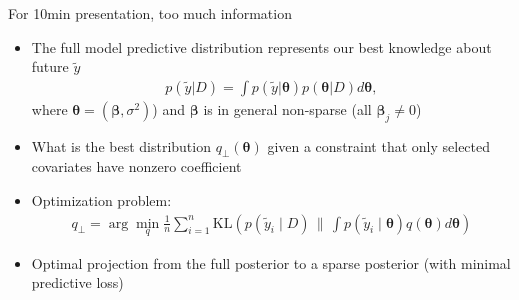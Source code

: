 \documentclass[english,t]{beamer}
\newcommand{\KLx}[2] { \mathrm{KL} {\left(#1 \, \| \, #2\right)} }
\newcommand{\vs}[1] { \boldsymbol{#1} }
\begin{document}
\begin{frame}

  {\Large\color{red} {For 10min presentation, too much information}}


\begin{itemize}
    \color{gray}
\item The full model predictive distribution represents our best knowledge about future $\tilde{y}$
	\begin{align*}
          p(\tilde{y} | D) = \int p(\tilde{y} | \vs\theta) p(\vs \theta| D) d\vs\theta,
        \end{align*}
        where $\vs \theta=(\vs \beta,\sigma^2)$) and $\vs \beta$ is in general non-sparse (all $\vs\beta_j \ne 0$)
	\item What is the best distribution $q_\perp(\vs \theta)$ given a
          constraint that only selected covariates have nonzero coefficient
	\item Optimization problem:
	\begin{align*}
		q_\perp = \arg \min_{q} \frac{1}{n} \sum_{i=1}^n 
			\KLx{p(\tilde{y}_i \mid D)}{\int p(\tilde{y}_i \mid \vs \theta) q(\vs \theta) d\vs\theta}%
	\end{align*}
      \item Optimal projection from the full posterior to a sparse
        posterior (with minimal predictive loss)
\end{itemize}


\end{frame}
\end{document}
